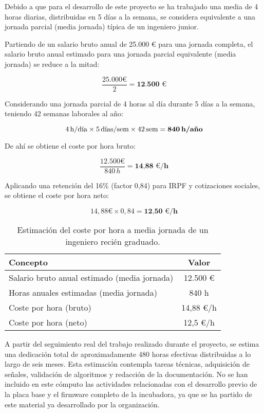 Debido a que para el desarrollo de este proyecto se ha trabajado una media de 4 horas diarias, distribuidas en 5 días a la semana, se considera equivalente a una jornada parcial (media jornada) típica de un ingeniero junior.

Partiendo de un salario bruto anual de 25.000 € para una jornada completa, el salario bruto anual estimado para una jornada parcial equivalente (media jornada) se reduce a la mitad:

\[
\frac{25.000 \text{€}}{2} = \textbf{12.500 €}
\]

Considerando una jornada parcial de 4 horas al día durante 5 días a la semana, teniendo 42 semanas laborales al año:

\[
4\,\text{h/día} \times 5\,\text{días/sem} \times 42\,\text{sem} = \textbf{840\,h/año}
\]

De ahí se obtiene el coste por hora bruto:

\[
\frac{12.500 \text{€}}{840\,h} = \textbf{14{,}88 €/h}
\]

Aplicando una retención del 16\% (factor 0,84) para IRPF y cotizaciones sociales, se obtiene el coste por hora neto:

\[
14{,}88 \text{€} \times 0{,}84 = \textbf{12{,}50 €/h}
\]


\begin{table}[H]
\centering
\begin{tabular}{|l|c|}
\hline
\textbf{Concepto} & \textbf{Valor} \\
\hline
Salario bruto anual estimado (media jornada) & 12.500 € \\
Horas anuales estimadas (media jornada) & 840 h \\
Coste por hora (bruto) & 14{,}88 €/h \\
Coste por hora (neto) & 12{,}5 €/h\\
\hline
\end{tabular}
\caption{Estimación del coste por hora a media jornada de un ingeniero recién graduado.}
\label{tab:coste_hora}
\end{table}

A partir del seguimiento real del trabajo realizado durante el proyecto, se estima una dedicación total de aproximadamente 480 horas efectivas distribuidas a lo largo de seis meses. Esta estimación contempla tareas técnicas, adquisición de señales, validación de algoritmos y redacción de la documentación. No se han incluido en este cómputo las actividades relacionadas con el desarrollo previo de la placa base y el firmware completo de la incubadora, ya que se ha partido de este material ya desarrollado por la organización.

